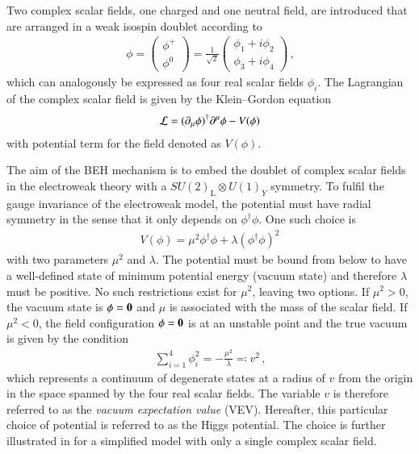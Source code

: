Two complex scalar fields, one charged and one neutral field, are introduced
that are arranged in a weak isospin doublet according to
\begin{align*}
  \phi =
  \begin{pmatrix}
    \phi^+ \\
    \phi^0
  \end{pmatrix}
  = \frac{1}{\sqrt{2}}
  \begin{pmatrix}
    \phi_1 + i \phi_2 \\
    \phi_3 + i \phi_4
  \end{pmatrix} \,\text{,}
\end{align*}
which can analogously be expressed as four real scalar fields $\phi_i$. The
Lagrangian of the complex scalar field is given by the Klein--Gordon equation
\begin{align*}
  \mathcal{L} = (\partial_\mu \phi)^\dagger \partial^\mu \phi - V(\phi)
\end{align*}
with potential term for the field denoted as $V(\phi)$.

The aim of the BEH mechanism is to embed the doublet of complex scalar fields in
the electroweak theory with a $SU(2)_{\text{L}}\otimes U(1)_Y$ symmetry. To
fulfil the gauge invariance of the electroweak model, the potential must have
radial symmetry in the sense that it only depends on $\phi^\dagger\phi$. One
such choice is
\begin{align*}
  V(\phi) = \mu^2 \phi^\dagger \phi + \lambda (\phi^\dagger \phi)^2
\end{align*}
with two parameters $\mu^2$ and $\lambda$. The potential must be bound from below to have a
well-defined state of minimum potential energy (vacuum state) and therefore
$\lambda$ must be positive. No such restrictions exist for $\mu^2$, leaving two
options. If $\mu^2 > 0$, the vacuum state is $\phi = \myvec{0}$ and $\mu$ is
associated with the mass of the scalar field. If $\mu^2 < 0$, the field
configuration $\phi = \myvec{0}$ is at an unstable point and the true vacuum is
given by the condition
\begin{align*}
  \sum_{i = 1}^4 \phi_i^2 = -\frac{\mu^2}{\lambda} \eqqcolon v^2 \,\text{,}
\end{align*}
which represents a continuum of degenerate states at a radius of $v$ from the
origin in the space spanned by the four real scalar fields. The variable $v$ is
therefore referred to as the \emph{vacuum expectation value} (VEV). Hereafter,
this particular choice of potential is referred to as the Higgs potential. The
choice is further illustrated in  for a simplified model
with only a single complex scalar field.

